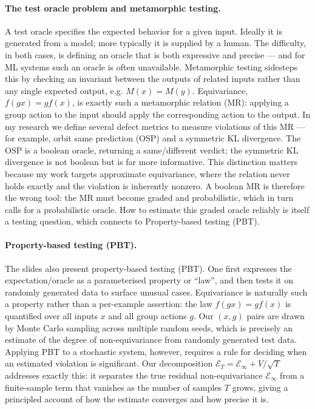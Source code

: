 \documentclass[11pt, a4paper]{article}
\begin{document}
\paragraph{The test oracle problem and metamorphic testing.} A test oracle specifies the expected behavior for a given input. Ideally it is generated from a model; more typically it is supplied by a human. The difficulty, in both cases, is defining an oracle that is both expressive and precise — and for ML systems such an oracle is often unavailable. Metamorphic testing sidesteps this by checking an invariant between the outputs of related inputs rather than any single expected output, e.g. $M(x) = M(y)$. Equivariance, $f(gx) = gf(x)$, is exactly such a metamorphic relation (MR): applying a group action to the input should apply the corresponding action to the output. In my research we define several defect metrics to measure violations of this MR — for example, orbit same prediction (OSP) and a symmetric KL divergence. The OSP is a boolean oracle, returning a same/different verdict; the symmetric KL divergence is not boolean but is far more informative. This distinction matters because my work targets approximate equivariance, where the relation never holds exactly and the violation is inherently nonzero. A boolean MR is therefore the wrong tool: the MR must become graded and probabilistic, which in turn calls for a probabilistic oracle. How to estimate this graded oracle reliably is itself a testing question, which connects to Property-based testing (PBT).

\paragraph{Property-based testing (PBT).} The slides also present property-based testing (PBT). One first expresses the expectation/oracle as a parameterised property or ``law'', and then tests it on randomly generated data to surface unusual cases. Equivariance is naturally such a property rather than a per-example assertion: the law $f(gx) = gf(x)$ is quantified over all inputs $x$ and all group actions $g$. Our $(x,g)$ pairs are drawn by Monte Carlo sampling across multiple random seeds, which is precisely an estimate of the degree of non-equivariance from randomly generated test data. Applying PBT to a stochastic system, however, requires a rule for deciding when an estimated violation is significant. Our decomposition $\mathcal{E}_{T} = \mathcal{E}_{\infty} + V/\sqrt{T}$ addresses exactly this: it separates the true residual non-equivariance $\mathcal{E}_\infty$ from a finite-sample term that vanishes as the number of samples $T$ grows, giving a principled account of how the estimate converges and how precise it is.
\end{document}
